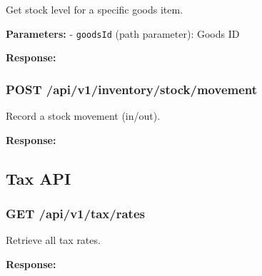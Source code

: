 Get stock level for a specific goods item.

\textbf{Parameters:} - \texttt{goodsId} (path parameter): Goods ID

\textbf{Response:}

\begin{Shaded}
\begin{Highlighting}[]
\FunctionTok{\{}
  \FunctionTok{:} \FunctionTok{,}
  \FunctionTok{:} \FunctionTok{,}
  \FunctionTok{:} 
\FunctionTok{\}}
\end{Highlighting}
\end{Shaded}

\subsubsection{POST
/api/v1/inventory/stock/movement}\label{post-apiv1inventorystockmovement}

Record a stock movement (in/out).

\textbf{Response:}

\begin{Shaded}
\begin{Highlighting}[]
\FunctionTok{\{}
  \FunctionTok{:} \FunctionTok{,}
  \FunctionTok{:} 
\FunctionTok{\}}
\end{Highlighting}
\end{Shaded}

\subsection{Tax API}\label{tax-api}

\subsubsection{GET /api/v1/tax/rates}\label{get-apiv1taxrates}

Retrieve all tax rates.

\textbf{Response:}

\begin{Shaded}
\begin{Highlighting}[]
\FunctionTok{\{}
  \FunctionTok{:} \FunctionTok{,}
  \FunctionTok{:} \OtherTok{[]}
\FunctionTok{\}}
\end{Highlighting}
\end{Shaded}

